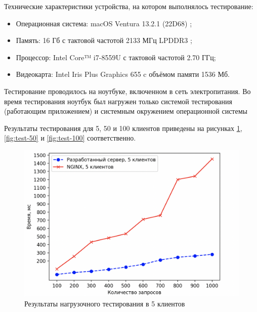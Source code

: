 Технические характеристики устройства, на котором выполнялось тестирование:

\begin{itemize}[label=---]
	\item Операционная система: macOS Ventura 13.2.1 (22D68) \cite{macos};
	\item Память: 16 Гб с тактовой частотой 2133 МГц LPDDR3 \cite{memory};
	\item Процессор: Intel Core™ i7-8559U \cite{intel} с тактовой частотой  2.70 ГГц;
	\item Видеокарта: Intel Iris Plus Graphics 655 \cite{graphics} c объёмом памяти 1536 Мб.
\end{itemize}

Тестирование проводилось на ноутбуке, включенном в сеть электропитания. Во время тестирования ноутбук был нагружен только системой тестирования (работающим приложением) и системным окружением операционной системы

Результаты тестирования для 5, 50 и 100 клиентов приведены на рисунках \ref{fig:test-5}, \ref{fig:test-50} и \ref{fig:test-100} соответственно. 

\begin{figure}[h]
	\centering
	\captionsetup{justification=centering}
	\includegraphics[width=120mm]{img/5.png}
	\caption{Результаты нагрузочного тестирования в 5 клиентов}
	\label{fig:test-5}
\end{figure}

